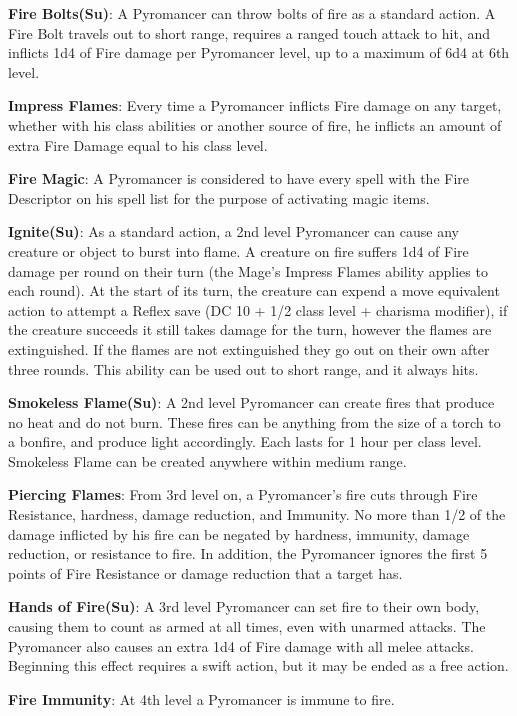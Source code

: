 \textbf{Fire Bolts(Su)}: A Pyromancer can throw bolts of fire as a standard action. A Fire Bolt travels out to short range, requires a ranged touch attack to hit, and inflicts 1d4 of Fire damage per Pyromancer level, up to a maximum of 6d4 at 6th level.

\textbf{Impress Flames}: Every time a Pyromancer inflicts Fire damage on any target, whether with his class abilities or another source of fire, he inflicts an amount of extra Fire Damage equal to his class level.

\textbf{Fire Magic}: A Pyromancer is considered to have every spell with the Fire Descriptor on his spell list for the purpose of activating magic items.

\textbf{Ignite(Su)}: As a standard action, a 2nd level Pyromancer can cause any creature or object to burst into flame. A creature on fire suffers 1d4 of Fire damage per round on their turn (the Mage’s Impress Flames ability applies to each round). At the start of its turn, the creature can expend a move equivalent action to attempt a Reflex save (DC 10 + 1/2 class level + charisma modifier), if the creature succeeds it still takes damage for the turn, however the flames are extinguished. If the flames are not extinguished they go out on their own after three rounds. This ability can be used out to short range, and it always hits.

\textbf{Smokeless Flame(Su)}: A 2nd level Pyromancer can create fires that produce no heat and do not burn. These fires can be anything from the size of a torch to a bonfire, and produce light accordingly. Each lasts for 1 hour per class level. Smokeless Flame can be created anywhere within medium range.

\textbf{Piercing Flames}: From 3rd level on, a Pyromancer’s fire cuts through Fire Resistance, hardness, damage reduction, and Immunity. No more than 1/2 of the damage inflicted by his fire can be negated by hardness, immunity, damage reduction, or resistance to fire. In addition, the Pyromancer ignores the first 5 points of Fire Resistance or damage reduction that a target has.

\textbf{Hands of Fire(Su)}: A 3rd level Pyromancer can set fire to their own body, causing them to count as armed at all times, even with unarmed attacks. The Pyromancer also causes an extra 1d4 of Fire damage with all melee attacks. Beginning this effect requires a swift action, but it may be ended as a free action.

\textbf{Fire Immunity}: At 4th level a Pyromancer is immune to fire.

